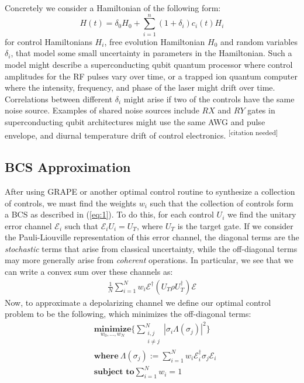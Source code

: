 \documentclass[aps,nofootinbib,pra,notitlepage,twocolumn]{revtex4-1}
\newcommand{\needcite}{{\color{blue}\textsuperscript{[citation needed]}}}
\begin{document}
Concretely we consider a Hamiltonian of the following form:
\begin{equation}\label{eq:2}
  H(t) = \delta_0H_0 + \sum_{i=1}^n (1 + \delta_i)c_i(t)H_i
\end{equation}
for control Hamiltonians $H_i$, free evolution Hamiltonian $H_0$ and random variables $\delta_i$, that model some small uncertainty in parameters in the Hamiltonian. Such a model might describe a superconducting qubit quantum processor where control amplitudes for the RF pulses vary over time, or a trapped ion quantum computer where the intensity, frequency, and phase of the laser might drift over time.\cite{Lekitsch2017} Correlations between different $\delta_i$ might arise if two of the controls have the same noise source. Examples of shared noise sources include $RX$ and $RY$ gates in superconducting qubit architectures might use the same AWG and pulse envelope, and diurnal temperature drift of control electronics. \needcite



\subsection{BCS Approximation}
After using GRAPE or another optimal control routine to synthesize a collection of controls, we must find the weights $w_i$ such that the collection of controls form a BCS as described in (\ref{eq:1}). To do this, for each control $U_i$ we find the unitary error channel $\mathcal{E}_i$ such that $\mathcal{E}_iU_i=U_T$, where $U_T$ is the target gate. If we consider the Pauli-Liouville representation\cite{Kimmel2014} of this error channel, the diagonal terms are the \textit{stochastic} terms that arise from classical uncertainty, while the off-diagonal terms may more generally arise from \textit{coherent} operations. In particular, we see that we can write a convex sum over these channels as:
\begin{align}
 \frac{1}{N} \sum^N_{i=1} w_i \mathcal{E}^{\dagger} (U_T\rho U_T^{\dagger}) \mathcal{E}
\end{align}
Now, to approximate a depolarizing channel we define our optimal control problem to be the following, which minimizes the off-diagonal terms:
\begin{equation}\label{eq:minimization}
  \begin{split}
    &\underset{w_0, ..., w_N}{\textbf{minimize}} \{\sum_{\substack{i,j \\ i\neq j}}^N|\sigma_i\Lambda(\sigma_j)|^2\}\\
    &\textbf{where}\ \Lambda(\sigma_j) := \sum^N_{i=1}w_i\mathcal{E}_i^{\dagger}\sigma_j\mathcal{E}_i\\
    &\textbf{subject to} \sum_{i=1}^Nw_i = 1
  \end{split}
\end{equation}
\end{document}

